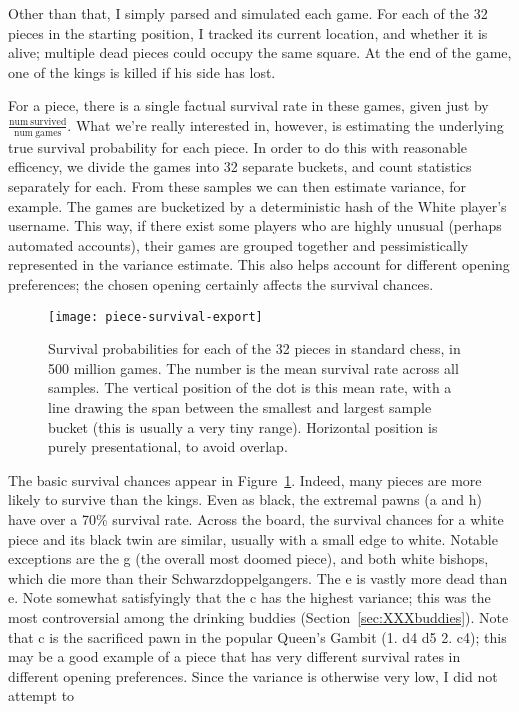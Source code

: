 \documentclass[twocolumn]{article}
\newcommand{\Pawn}[1][1.3ex]{%
\adjustbox{Trim=4.3pt 2.6pt 4.3pt 0pt,width=#1,margin=0.2ex 0ex 0.2ex 0ex}{\BlackPawnOnWhite}%
}%
\begin{document}
Other than that, I simply parsed and simulated each game. For each
of the 32 pieces in the starting position, I tracked its current
location, and whether it is alive; multiple dead pieces could
occupy the same square. At the end of the game, one of the kings is
killed if his side has lost.

For a piece, there is a single factual survival rate in these games,
given just by $\frac{\mathrm{num~survived}}{\mathrm{num~games}}$. What
we're really interested in, however, is estimating the underlying true
survival probability for each piece. In order to do this with
reasonable efficency, we divide the games into 32 separate buckets,
and count statistics separately for each. From these samples we can
then estimate variance, for example. The games are bucketized by a
deterministic hash of the White player's username. This way, if there
exist some players who are highly unusual (perhaps automated
accounts), their games are grouped together and pessimistically
represented in the variance estimate. This also helps account for
different opening preferences; the chosen opening certainly affects
the survival chances.

\begin{figure}[htb]
  \begin{center}
    \texttt{[image: piece-survival-export]}
  \end{center}\vspace{-0.1in}
  \caption{Survival probabilities for each of the 32 pieces in standard
    chess, in 500 million games. The number is the mean survival rate
    across all samples. The vertical position of the dot is this mean
    rate, with a line drawing the span between the smallest and largest
    sample bucket (this is usually a very tiny range).
    Horizontal position is purely presentational, to avoid overlap.}
  \label{fig:piece-survival}
\end{figure}

The basic survival chances appear in Figure~\ref{fig:piece-survival}.
Indeed, many pieces are more likely to survive than the kings. Even as
black, the extremal pawns (\pawn a and \pawn h) have over a 70\%
survival rate. Across the board, the survival chances for a white
piece and its black twin are similar, usually with a small edge to
white. Notable exceptions are the \knight g (the overall most doomed
piece), and both white bishops, which die more than their
Schwarzdoppelgangers. The \pawn e is vastly more dead than \Pawn e.
Note somewhat satisfyingly that the \pawn c has the highest variance;
this was the most controversial among the drinking buddies
(Section~\ref{sec:XXXbuddies}). Note that \pawn c is the sacrificed
pawn in the popular Queen's Gambit (1. d4 d5 2. c4); this may be a
good example of a piece that has very different survival rates in
different opening preferences. Since the variance is otherwise very
low, I did not attempt to
\end{document}
